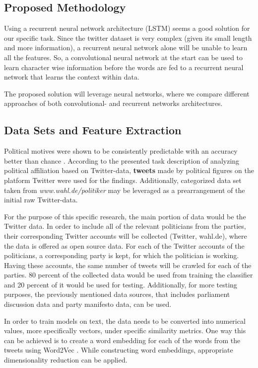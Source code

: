 \documentclass[10pt, oneside]{article}
\begin{document}
\begin{multicols}{2}
\section{Proposed Methodology}

Using a recurrent neural network architecture (LSTM) seems a good solution for our specific task. Since the twitter dataset is very complex (given its small length and more information), a recurrent neural network alone will be unable to learn all the features. So, a convolutional neural network at the start can be used to learn character wise information before the words are fed to a recurrent neural network that learns the context within data.

The proposed solution will leverage neural networks, where we compare different approaches of both convolutional- and recurrent networks architectures.

\subsection{Data Sets and Feature Extraction} 

Political motives were shown to be consistently predictable with an accuracy better than chance \cite{Biessmann2017}.
According to the presented task description of analyzing political affiliation based on Twitter-data, \textbf{tweets} made by political figures on the platform Twitter were used for the findings.
Additionally, categorized data set taken from \textit{www.wahl.de/politiker} may be leveraged as a prearrangement of the initial raw Twitter-data.

For the purpose of this specific research, the main portion of data would be the Twitter data. In order to include all of the relevant politicians from the parties, their corresponding Twitter accounts will be collected (Twitter, wahl.de), where the data is offered as open source data.
For each of the Twitter accounts of the politicians, a corresponding party is kept, for which the politician is working. Having these accounts, the same number of tweets will be crawled for each of the parties. 80 percent of the collected data would be used from training the classifier and 20 percent of it would be used for testing.
Additionally, for more testing purposes, the previously mentioned data sources, that includes parliament discussion data and party manifesto data, can be used. 

In order to train models on text, the data needs to be converted into numerical values, more specifically vectors, under specific similarity metrics. One way this can be achieved is to create a word embedding for each of the words from the tweets using Word2Vec \cite{DBLP:journals/corr/abs-1301-3781}. While constructing word embeddings, appropriate dimensionality reduction can be applied.


\end{multicols}
\end{document}
